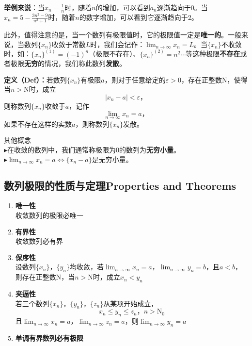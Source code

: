 \documentclass[UTF8]{ctexart}
\begin{document}
\textbf{举例来说}：当\( x_n = \frac{1}{n} \)时，随着$n$的增加，可以看到$a_n$逐渐趋向于0。当$ x_n=5-\frac {3n^2-9}{n^2+1}$时，随着$n$的数字增加，可以看到它逐渐趋向于2。

此外，值得注意的是，当一个数列有极限值时，它的极限值一定是\textbf{唯一的}。一般来说，当数列$\{ x_n \}$收敛于常数$L$时，我们会记作：\( \lim_{n \to \infty} x_n = L\)。当$\{x_n\}$不收敛时，如：$\{x_n\}^{(1)}=(-1)^n$（极限不存在）、$\{x_n\}^{(2)}=n^2 \cdots$等这种极限\textbf{不存在}或者极限\textbf{无穷}的情况，我们称此数列\textbf{发散}。



\begin{question}
\textbf{定义（Def）：}若数列$\{ x_n\}$有极限$a$，则对于任意给定的$ \varepsilon > 0$，存在正整数$\text{N}$，使得当$n > \text{N}$时，成立
\begin{equation}
  |x_n-a| < \varepsilon \text{，}
\end{equation}
则称数列$\{ x_n\}$收敛于$a$，记作
\begin{equation}
  \lim_{n \to \infty} x_n = a \text{，}
\end{equation}
如果不存在这样的实数$a$，则称数列$\{ x_n\}$发散。
\end{question}

\begin{info}[Notice:]其他概念\\
	$\blacktriangleright$在收敛的数列中，我们通常称极限为0的数列为\textbf{无穷小量}。\\
	$\blacktriangleright$\( \lim_{n \to \infty} x_n = a \Leftrightarrow \{x_n - a \} \)是无穷小量。
\end{info}

\subsection{数列极限的性质与定理Properties and Theorems}
\begin{enumerate}
	\item {\textbf{唯一性}}\\
	收敛数列的极限必唯一
	\item {\textbf{有界性}}\\
	收敛数列必有界
	\item {\textbf{保序性}}\\
	设数列$\{ x_n \}$，$\{  y_n \}$均收敛，若\( \lim_{n \to \infty} x_n = a \)，\( \lim_{n \to \infty} y_n = b \)，且$a<b$，则存在正整数$\text{N}$，当$n>\text{N}$时，成立$x_n < y_n$
	\item {\textbf{夹逼性}}\\
	若三个数列$\{ x_n \}$，$\{  y_n \}$，$\{  z_n \}$从某项开始成立，
	\begin{equation}
		x_n \leqslant y_n \leqslant z_n \text{，} n>\text{N}_0
	\end{equation}
	且\( \lim_{n \to \infty} x_n = a \)，\( \lim_{n \to \infty} z_n = a \)，则\( \lim_{n \to \infty} y_n = a \)
	\item {\textbf{单调有界数列必有极限}}
\end{enumerate}
\end{document}
